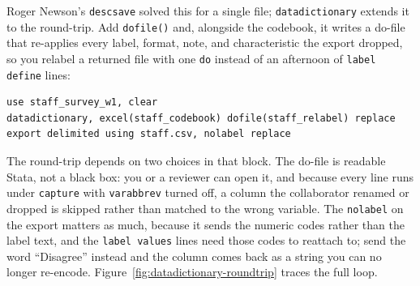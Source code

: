 Roger Newson's \texttt{descsave} solved this for a single file; \texttt{datadictionary} extends it to the round-trip. Add \texttt{dofile()} and, alongside the codebook, it writes a do-file that re-applies every label, format, note, and characteristic the export dropped, so you relabel a returned file with one \texttt{do} instead of an afternoon of \texttt{label define} lines:
\par
{\footnotesize
\begin{verbatim}
use staff_survey_w1, clear
datadictionary, excel(staff_codebook) dofile(staff_relabel) replace
export delimited using staff.csv, nolabel replace
\end{verbatim}
}
The round-trip depends on two choices in that block. The do-file is readable Stata, not a black box: you or a reviewer can open it, and because every line runs under \texttt{capture} with \texttt{varabbrev} turned off, a column the collaborator renamed or dropped is skipped rather than matched to the wrong variable. The \texttt{nolabel} on the export matters as much, because it sends the numeric codes rather than the label text, and the \texttt{label values} lines need those codes to reattach to; send the word \enquote{Disagree} instead and the column comes back as a string you can no longer re-encode. Figure~\ref{fig:datadictionary-roundtrip} traces the full loop.

